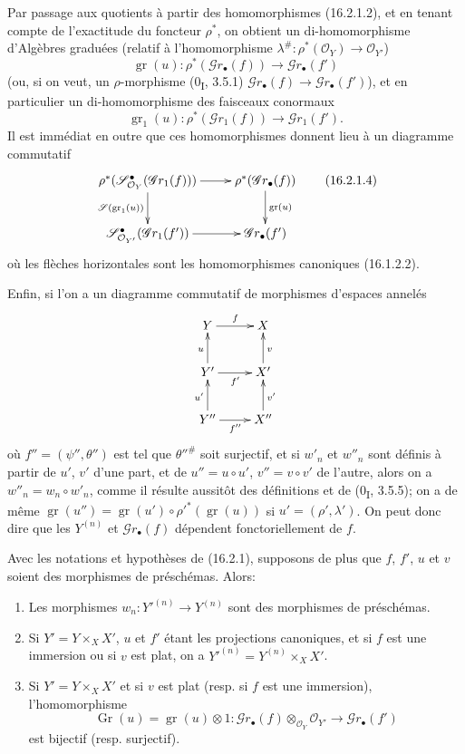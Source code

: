 \begin{env}[16.2.1]
Par passage aux quotients à partir des homomorphismes (16.2.1.2), et en tenant
compte de l'exactitude du foncteur $\rho^*$, on obtient un di-homomorphisme
d'Algèbres graduées (relatif à l'homomorphisme
$\lambda^\#:\rho^*(\mathcal{O}_Y)\to\mathcal{O}_{Y'}$)
\[
  \operatorname{gr}(u):
  \rho^*(\mathscr{G}r_\bullet(f))
  \longrightarrow\mathscr{G}r_\bullet(f')
  \tag{16.2.1.3}
  \label{IV.16.2.1.3}
\]
(ou, si on veut, un $\rho$-morphisme (0\textsubscript{I}, 3.5.1)
$\mathscr{G}r_\bullet(f)\to\mathscr{G}r_\bullet(f')$), et en particulier un
di-homomorphisme des faisceaux conormaux
\[
  \operatorname{gr}_1(u):
  \rho^*(\mathscr{G}r_1(f))\longrightarrow\mathscr{G}r_1(f').
\]
Il est immédiat en outre que ces homomorphismes donnent lieu à un diagramme
commutatif
\[
  \xymatrix{
    \rho^*(\mathscr{S}_{\mathcal{O}_Y}^{\bullet}
      (\mathscr{G}r_1(f)))
      \ar[r] \ar[d]_-{\mathscr{S}(\operatorname{gr}_1(u))}
      & \rho^*(\mathscr{G}r_\bullet(f))
        \ar[d]^-{\operatorname{gr}(u)} \\
    \mathscr{S}_{\mathcal{O}_{Y'}}^{\bullet}
      (\mathscr{G}r_1(f'))
      \ar[r]
      & \mathscr{G}r_\bullet(f')
  }
  \tag{16.2.1.4}
  \label{IV.16.2.1.4}
\]
où les flèches horizontales sont les homomorphismes canoniques (16.1.2.2).

Enfin, si l'on a un diagramme commutatif de morphismes d'espaces annelés
\[
  \xymatrix{
    Y \ar[r]^f & X \\
    Y' \ar[r]_{f'} \ar[u]^u & X' \ar[u]_v \\
    Y'' \ar[r]_{f''} \ar[u]^{u'} & X'' \ar[u]_{v'}
  }
\]
où $f''=(\psi'',\theta'')$ est tel que $\theta''^\#$ soit surjectif, et si
$w'_n$ et $w''_n$ sont définis à partir de $u'$, $v'$ d'une part, et de
$u''=u\circ u'$, $v''=v\circ v'$ de l'autre, alors on a
$w''_n=w_n\circ w'_n$, comme il résulte aussitôt des définitions et de
(0\textsubscript{I}, 3.5.5); on a de même
$\operatorname{gr}(u'')=
\operatorname{gr}(u')\circ\rho'^*(\operatorname{gr}(u))$ si
$u'=(\rho',\lambda')$. On peut donc dire que les $Y^{(n)}$ et
$\mathscr{G}r_\bullet(f)$ dépendent fonctoriellement de $f$.
\end{env}

\begin{proposition}[16.2.2]
\label{IV.16.2.2}
Avec les notations et hypothèses de (16.2.1), supposons de plus que $f$, $f'$,
$u$ et $v$ soient des morphismes de préschémas. Alors:
\begin{enumerate}
\item[(i)] Les morphismes $w_n:Y'^{(n)}\to Y^{(n)}$ sont des morphismes de
préschémas.
\item[(ii)] Si $Y'=Y\times_X X'$, $u$ et $f'$ étant les projections
canoniques, et si $f$ est une immersion ou si $v$ est plat, on a
$Y'^{(n)}=Y^{(n)}\times_X X'$.
\item[(iii)] Si $Y'=Y\times_X X'$ et si $v$ est plat (resp. si $f$ est une
immersion), l'homomorphisme
\[
  \operatorname{Gr}(u)=\operatorname{gr}(u)\otimes 1:
  \mathscr{G}r_\bullet(f)\otimes_{\mathcal{O}_Y}\mathcal{O}_{Y'}
  \longrightarrow\mathscr{G}r_\bullet(f')
\]
est bijectif (resp. surjectif).
\end{enumerate}
\end{proposition}


